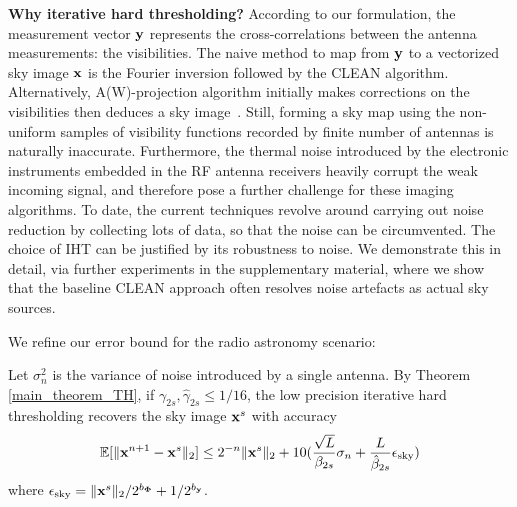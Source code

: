 \documentclass[aoas,preprint]{imsart}
\numberwithin{equation}{section}
\theoremstyle{plain}
\begin{document}
\vspace{0.5em}
{\bf Why iterative hard thresholding?} According to our formulation, the measurement vector ${\bf y}$ represents the cross-correlations between the antenna measurements: the visibilities. The naive method to map from ${\bf y}$ to a vectorized sky image ${\bf x}$ is the Fourier inversion followed by the {CLEAN} algorithm. Alternatively, {A(W)-projection} algorithm initially makes corrections on the visibilities then deduces a sky image~\cite{bhatganar2008ra}. Still, forming a sky map using the non-uniform samples of visibility functions recorded by finite number of antennas is naturally inaccurate. Furthermore, the thermal noise introduced by the electronic instruments embedded in the RF antenna receivers heavily corrupt the weak incoming signal, and therefore pose a further challenge for these imaging algorithms. To date, the current techniques revolve around carrying out noise reduction by collecting lots of data, so that the noise can be circumvented. The choice of IHT can be justified by its robustness to noise. We demonstrate this in detail, via further experiments in the supplementary material, where we show that the baseline {CLEAN} approach often resolves noise artefacts as actual sky sources. 
\vspace{0.1em}

We refine our error bound for the radio astronomy scenario:

\begin{corollary}
Let $\sigma_n^2$ is the variance of noise introduced by a single antenna. By Theorem \ref{main_theorem_TH}, if ${\gamma}_{2s}, \hat{\gamma}_{2s}\leq 1/16$, the low precision iterative hard thresholding recovers the sky image ${\bf x}^s$ with accuracy
\begin{equation}
    \mathbb{E}[\|{\bf x}^{n+1} - {\bf x}^s \|_2] \leq 2^{-n}\| {\bf x}^s\|_2 + 10(\frac{\sqrt{L}}{\beta_{2s}}\sigma_n+\frac{L}{\hat{\beta}_{2s}}\epsilon_{\rm{sky}})
\end{equation}
where $\epsilon_{\rm{sky}} =  \|{\bf x}^s \|_2/2^{b_{\bf \Phi}} + 1/2^{b_{\bf y}}$.
\label{corollary1}
\end{corollary}

\end{document}
